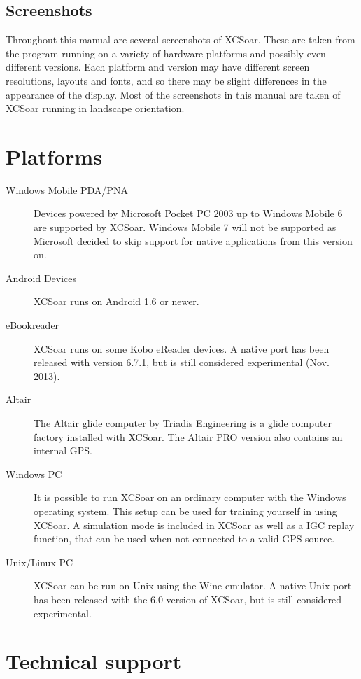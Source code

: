 \subsection*{Screenshots}
Throughout this manual are several screenshots of XCSoar. These are
taken from the program running on a variety of hardware platforms and possibly
even different versions. Each platform and version may have different screen
resolutions, layouts and fonts, and so there may be slight differences in the
appearance of the display. Most of the screenshots in this manual are taken of
XCSoar running in landscape orientation.

\section{Platforms}
\begin{description}
\item[Windows Mobile PDA/PNA]
Devices powered by Microsoft Pocket PC 2003 up to Windows Mobile 6 are
supported by XCSoar. Windows Mobile 7 will not be supported as Microsoft decided
to skip support for native applications from this version on.
\item[Android Devices]
XCSoar runs on Android 1.6 or newer.
\item [eBookreader]
XCSoar runs on some Kobo eReader devices. A native port has been released with version 6.7.1, but is still considered experimental (Nov. 2013).
\item[Altair]
The Altair glide computer by Triadis Engineering is a glide computer
factory installed with XCSoar.  The Altair PRO version also contains
an internal GPS.
\item[Windows PC]
It is possible to run XCSoar on an ordinary computer with the Windows
operating system. This setup can be used for training yourself in using XCSoar.
A simulation mode is included in XCSoar as well as a IGC replay function, that
can be used when not connected to a valid GPS source.
\item[Unix/Linux PC]
XCSoar can be run on Unix using the Wine emulator. A native Unix port
has been released with the 6.0 version of XCSoar, but is still
considered experimental.
\end{description}



\section{Technical support}

